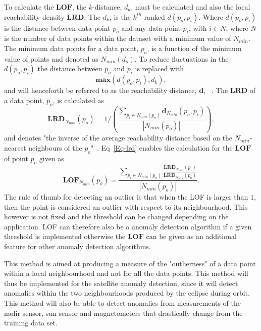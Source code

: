 To calculate the $\mathbf{LOF}$, the $k$-distance, $d_k$, must be calculated and also the local reachability density $\mathbf{LRD}$. The $d_k$, is the $k^{th}$ ranked $d(p_o,p_i)$. Where $d(p_o,p_i)$ is the distance between data point $p_o$ and any data point $p_i$, with $i \in N$, where $N$ is the number of data points within the dataset with a minimum value of $N_{min}$. The minimum data points for a data point, $p_o$, is a function of the minimum value of points and denoted as $N_{min}(d_o)$. To reduce fluctuations in the $d(p_o,p_i)$ the distance between $p_o$ and $p_i$ is replaced with 
\begin{equation}
\textbf{max} \left( d(p_o,p_i), d_k \right),
\end{equation}
and will henceforth be referred to as the reachability distance, $\mathbf{d}$, ~\cite{breunig2000lof}. The $\mathbf{LRD}$ of a data point, $p_o$, is calculated as 
\begin{equation}
\mathbf{LRD}_{N_{min}}(p_o) = 1/\left(\frac{\sum\limits_{p_i \in N_{min}(p_o)}^{} \mathbf{d}_{N_{min}}(p_o,p_i)}{\left|N_{min}(p_o) \right|}\right),
\label{Eq-lrd}
\end{equation}
and denotes "the inverse of the average reachability distance based on the $N_{min}$-nearest neighbours of the $p_o$"~\cite{breunig2000lof}. Eq~\ref{Eq-lrd} enables the calculation for the $\mathbf{LOF}$ of point $p_o$ given as
\begin{equation}
\mathbf{LOF}_{N_{min}}(p_o) = \frac{\sum\limits_{p_i \in N_{min}(p_o)}^{}\frac{\mathbf{LRD}_{N_{min}}(p_i)}{\mathbf{LRD}_{N_{min}}(p_o)}}{\left| N_{min}(p_o) \right|}.
\label{Eq-LOF}
\end{equation}
The rule of thumb for detecting an outlier is that when the LOF is larger than $1$, then the point is considered an outlier with respect to its neighbourhood. This however is not fixed and the threshold can be changed depending on the application. LOF can therefore also be a anomaly detection algorithm if a given threshold is implemented otherwise the $\mathbf{LOF}$ can be given as an additional feature for other anomaly detection algorithms.

This method is aimed at producing a measure of the "outlierness" of a data point within a local neighbourhood and not for all the data points. This method will thus be implemented for the satellite anomaly detection, since it will detect anomalies within the two neighbourhoods produced by the eclipse during orbit. This method will also be able to detect anomalies from measurements of the nadir sensor, sun sensor and magnetometers that drastically change from the training data set. 

